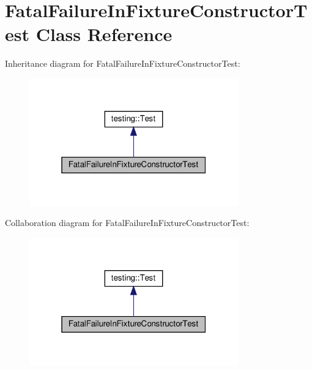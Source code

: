 \hypertarget{class_fatal_failure_in_fixture_constructor_test}{}\section{Fatal\+Failure\+In\+Fixture\+Constructor\+Test Class Reference}
\label{class_fatal_failure_in_fixture_constructor_test}


Inheritance diagram for Fatal\+Failure\+In\+Fixture\+Constructor\+Test\+:
\nopagebreak
\begin{figure}[H]
\begin{center}
\leavevmode
\includegraphics[width=256pt]{class_fatal_failure_in_fixture_constructor_test__inherit__graph}
\end{center}
\end{figure}


Collaboration diagram for Fatal\+Failure\+In\+Fixture\+Constructor\+Test\+:
\nopagebreak
\begin{figure}[H]
\begin{center}
\leavevmode
\includegraphics[width=256pt]{class_fatal_failure_in_fixture_constructor_test__coll__graph}
\end{center}
\end{figure}
